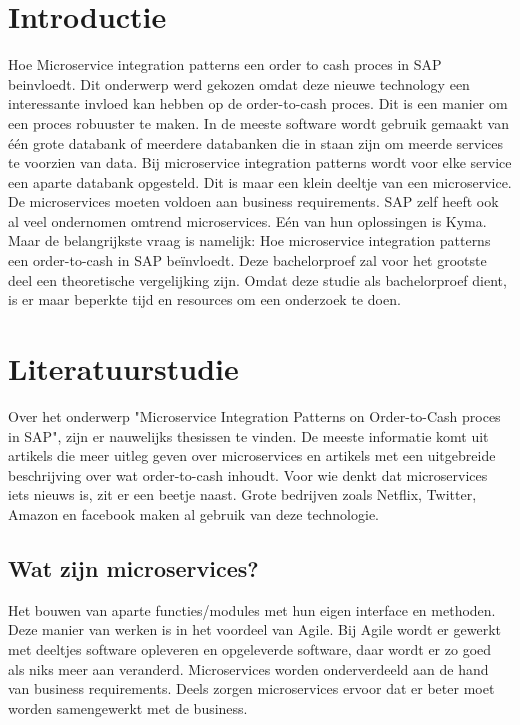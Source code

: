 
\section{Introductie} %
\label{sec:introductie}

Hoe Microservice integration patterns een order to cash proces in SAP beinvloedt. Dit onderwerp werd gekozen omdat deze nieuwe technology een interessante invloed kan hebben op de order-to-cash proces. Dit is een manier om een proces robuuster te maken. In de meeste software wordt gebruik gemaakt van één grote databank of meerdere databanken die in staan zijn om meerde services te voorzien van data. Bij microservice integration patterns wordt voor elke service een aparte databank opgesteld. Dit is maar een klein deeltje van een microservice. De microservices moeten voldoen aan business requirements. SAP zelf heeft ook al veel ondernomen omtrend microservices. Eén van hun oplossingen is Kyma. Maar de belangrijkste vraag is namelijk: Hoe microservice integration patterns een order-to-cash in SAP beïnvloedt. Deze bachelorproef zal voor het grootste deel een theoretische vergelijking zijn. Omdat deze studie als bachelorproef dient, is er maar beperkte tijd en resources om een onderzoek te doen. 


\section{Literatuurstudie}
\label{sec:state-of-the-art}

Over het onderwerp "Microservice Integration Patterns on Order-to-Cash proces in SAP", zijn er nauwelijks thesissen te vinden. De meeste informatie komt uit artikels die meer uitleg geven over microservices en artikels met een uitgebreide beschrijving over wat order-to-cash inhoudt.
Voor wie denkt dat microservices iets nieuws is, zit er een beetje naast. Grote bedrijven zoals Netflix, Twitter, Amazon en facebook maken al gebruik van deze technologie. ~\cite{CiberBlog2018}

\subsection{Wat zijn microservices?}
Het bouwen van aparte functies/modules met hun eigen interface en methoden. Deze manier van werken is in het voordeel van Agile. Bij Agile wordt er gewerkt met deeltjes software opleveren en opgeleverde software, daar wordt er zo goed als niks meer aan veranderd. Microservices worden onderverdeeld aan de hand van business requirements. Deels zorgen microservices ervoor dat er beter moet worden samengewerkt met de business.

